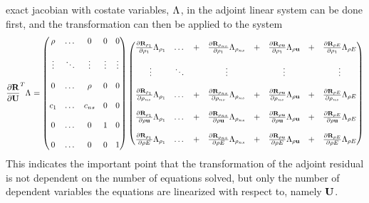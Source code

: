 \documentclass[a4paper]{report}
\begin{document}
exact jacobian with costate variables, $\Lambda_{}$, in the adjoint linear system
can be done first, and the transformation can then be applied to the system
\begin{equation}
  \begin{aligned}
    \pd{\mr}{\mU}^{T} \adjlam{} =
    \begin{pmatrix}
      \rho   & \dots  & 0      &  0      & 0      \\ \\
      \vdots & \ddots & \vdots &  \vdots & \vdots \\ \\
      0      & \dots  &\rho    &  0      & 0      \\ \\
      c_1    & \dots  & c_{ns} &  0      & 0      \\ \\
      0      & \dots  & 0      &  1      & 0      \\ \\
      0      & \dots  & 0      &  0      & 1
    \end{pmatrix}
    \begin{pmatrix}
      \rlprod{\rho_1}{\rho_1}    & \dots  &+& \rlprod{\rho_{ns}}{\rho_1}    &+& \rlprod{\rho \vu}{\rho_1}    &+& \rlprod{\rho E}{\rho_1} \\ \\
      \vdots                     & \ddots & & \vdots                        & & \vdots                       & & \vdots                   \\ \\
      \rlprod{\rho_1}{\rho_{ns}} & \dots  &+& \rlprod{\rho_{ns}}{\rho_{ns}} &+& \rlprod{\rho \vu}{\rho_{ns}} &+& \rlprod{\rho E}{\rho_{ns}} \\ \\
      \rlprod{\rho_1}{\rho \vu}  & \dots  &+& \rlprod{\rho_{ns}}{\rho \vu}  &+& \rlprod{\rho \vu}{\rho \vu}  &+& \rlprod{\rho E}{\rho \vu} \\ \\
      \rlprod{\rho_1}{\rho E}    & \dots  &+& \rlprod{\rho_{ns}}{\rho E}    &+& \rlprod{\rho \vu}{\rho E}    &+& \rlprod{\rho E}{\rho E}
    \end{pmatrix}
  \end{aligned}
  \label{adj-drdv}
\end{equation}
This indicates the important point that the transformation of the adjoint
residual is not dependent on the number of equations solved, but only the number
of dependent variables the equations are linearized with respect to, namely
$\mathbf U$.
\end{document}

